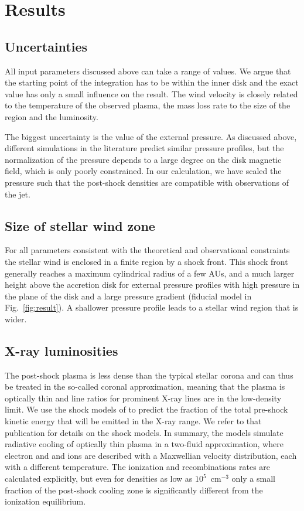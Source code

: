 \documentclass{emulateapj}
\begin{document}
\section{Results}
\label{sect:results}

\subsection{Uncertainties}
All input parameters discussed above can take a range of values. We argue that the starting point of the integration has to be within the inner disk and the exact value has only a small influence on the result. The wind velocity is closely related to the temperature of the observed plasma, the mass loss rate to the size of the region and the luminosity.

The biggest uncertainty is the value of the external pressure. As discussed above, different simulations in the literature predict similar pressure profiles, but the normalization of the pressure depends to a large degree on the disk magnetic field, which is only poorly constrained. In our calculation, we have scaled the pressure such that the post-shock densities are compatible with observations of the jet.


\subsection{Size of stellar wind zone}
For all parameters consistent with the theoretical and observational constraints the stellar wind is enclosed in a finite region by a shock front. This shock front generally reaches a maximum cylindrical radius of a few AUs, and a much larger height above the accretion disk for external pressure profiles with high pressure in the plane of the disk and a large pressure gradient (fiducial model in Fig.~\ref{fig:result}). A shallower pressure profile leads to a stellar wind region that is wider. 

\subsection{X-ray luminosities}
\label{sect:LX}
The post-shock plasma is less dense than the typical stellar corona and can thus be treated in the so-called coronal approximation, meaning that the plasma is optically thin and line ratios for prominent X-ray lines are in the low-density limit. We use the shock models of \citet{2007A&A...466.1111G} to predict the fraction of the total pre-shock kinetic energy that will be emitted in the X-ray range. We refer to that publication for details on the shock models. In summary, the models simulate radiative cooling of optically thin plasma in a two-fluid approximation, where electron and and ions are described with a Maxwellian velocity distribution, each with a different temperature. The ionization and recombinations rates are calculated explicitly, but even for densities as low as $10^5$~cm$^{-3}$ only a small fraction of the post-shock cooling zone is significantly different from the ionization equilibrium.
\end{document}
